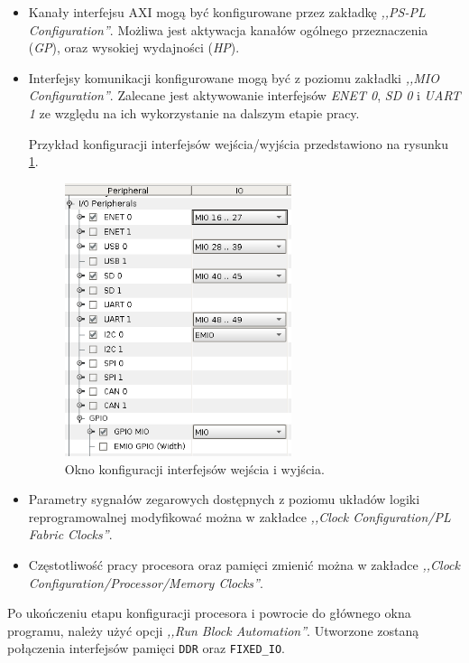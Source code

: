 \begin{itemize}
	\item Kanały interfejsu AXI mogą być konfigurowane przez zakładkę \emph{,,PS-PL Configuration''}. Możliwa jest aktywacja kanałów ogólnego przeznaczenia (\emph{GP}), oraz wysokiej wydajności (\emph{HP}).
	
	\item Interfejsy komunikacji konfigurowane mogą być z poziomu zakładki \emph{,,MIO Configuration''}. Zalecane jest aktywowanie interfejsów \emph{ENET 0}, \emph{SD 0} i \emph{UART 1} ze względu na ich wykorzystanie na dalszym etapie pracy.
	
	Przykład konfiguracji interfejsów wejścia/wyjścia przedstawiono na rysunku \ref{fig:vivado-mio-configuration}.
	\begin{figure}[ht]
		\centering
		\includegraphics[height=8cm]{img/vivado/mio-configuration.png}
		\caption{Okno konfiguracji interfejsów wejścia i wyjścia.}
		\label{fig:vivado-mio-configuration}
	\end{figure}
	
	\item Parametry sygnałów zegarowych dostępnych z poziomu układów logiki reprogramowalnej modyfikować można w zakładce \emph{,,Clock Configuration/PL Fabric Clocks''}.
	
	\item Częstotliwość pracy procesora oraz pamięci zmienić można w zakładce \emph{,,Clock Configuration/Processor/Memory Clocks''}.
\end{itemize}

Po ukończeniu etapu konfiguracji procesora i powrocie do głównego okna programu, należy użyć opcji \emph{,,Run Block Automation''}. Utworzone zostaną połączenia interfejsów pamięci \texttt{DDR} oraz \texttt{FIXED\_IO}.

